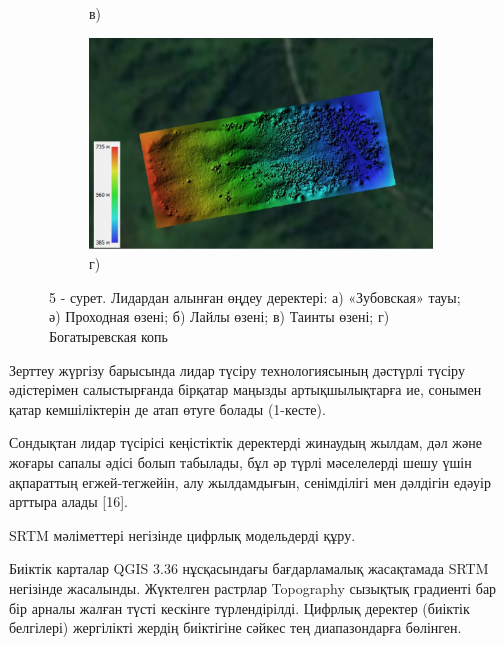 \begin{figure}[H]
\begin{subfigure}[t]{0.45\textwidth}
        \caption*{в)}
    \end{subfigure}
    \begin{subfigure}[t]{0.7\textwidth}
        \centering
        \includegraphics[width=\textwidth]{media/ict2/image207}
        \caption*{г)}
    \end{subfigure}
    \caption*{5 - сурет. Лидардан алынған өңдеу деректері: а) «Зубовская» тауы; ә) Проходная өзені; б) Лайлы өзені; в) Таинты өзені; г) Богатыревская копь}
\end{figure}

\begin{multicols}{2}
Зерттеу жүргізу барысында лидар түсіру технологиясының дәстүрлі түсіру
әдістерімен салыстырғанда бірқатар маңызды артықшылықтарға ие, сонымен
қатар кемшіліктерін де атап өтуге болады (1-кесте).

Сондықтан лидар түсірісі кеңістіктік деректерді жинаудың жылдам, дәл
және жоғары сапалы әдісі болып табылады, бұл әр түрлі мәселелерді шешу
үшін ақпараттың егжей-тегжейін, алу жылдамдығын, сенімділігі мен
дәлдігін едәуір арттыра алады {[}16{]}.

SRTM мәліметтері негізінде цифрлық модельдерді құру.

Биіктік карталар QGIS 3.36 нұсқасындағы бағдарламалық жасақтамада SRTM
негізінде жасалынды. Жүктелген растрлар Topography сызықтық градиенті
бар бір арналы жалған түсті кескінге түрлендірілді. Цифрлық деректер
(биіктік белгілері) жергілікті жердің биіктігіне сәйкес тең
диапазондарға бөлінген.

\end{multicols}

